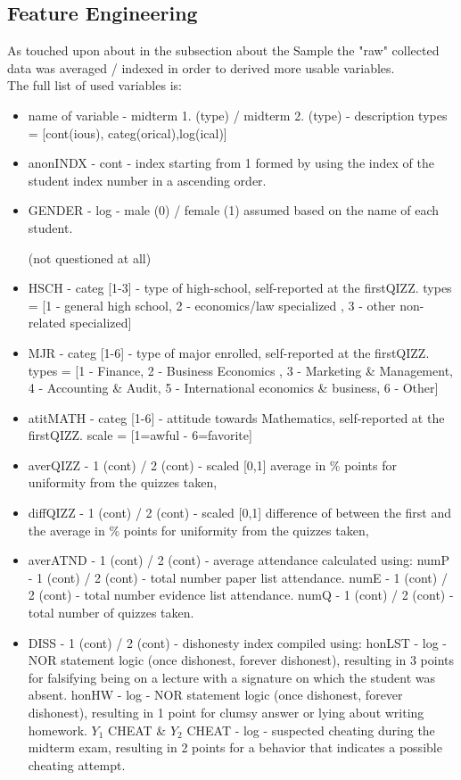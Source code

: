 \documentclass[]{article}
\begin{document}
	\subsection{Feature Engineering}
	As touched upon about in the subsection about the Sample the "raw" collected data was averaged / indexed in order to derived more usable variables.\\
	
	The full list of used variables is:
	
	\begin{itemize}
		\item [] name of variable - midterm 1. (type) / midterm 2. (type) - description
		\subitem types = [cont(ious), categ(orical),log(ical)]
		\item anonINDX - cont - index starting from 1 formed by using the index of the student index number in a ascending order.
		\item GENDER - log - male (0) / female (1) assumed based on the name of each student. \begin{small}(not questioned at all)\end{small}
		\item HSCH - categ [1-3] - type of high-school, self-reported at the firstQIZZ. 
		\subitem types = [1 - general high school, 2 - economics/law specialized , 3 - other non-related specialized]
		\item MJR - categ [1-6] - type of major enrolled, self-reported at the firstQIZZ.
		\subitem types = [1 - Finance, 2 - Business Economics , 3 - Marketing \& Management, 4 - Accounting \& Audit, 5 - International economics \& business, 6 - Other]
		\item atitMATH - categ [1-6] - attitude towards Mathematics, self-reported at the firstQIZZ.
		\subitem scale = [1=awful - 6=favorite]
		
		\item averQIZZ - 1 (cont) / 2 (cont) - scaled [0,1] average in \% points for uniformity from the quizzes taken,
		\item diffQIZZ - 1 (cont) / 2 (cont) - scaled [0,1] difference of between the first and the average in \% points for uniformity from the quizzes taken, 
		\item averATND - 1 (cont) / 2 (cont) - average attendance calculated using: 
		\subitem numP - 1 (cont) / 2 (cont) - total number paper list attendance.
		\subitem numE - 1 (cont) / 2 (cont) - total number evidence list attendance.
		\subitem numQ - 1 (cont) / 2 (cont) - total number of quizzes taken.
		\item DISS - 1 (cont) / 2 (cont) - dishonesty index compiled using:
		\subitem honLST - log - NOR statement logic (once dishonest, forever dishonest), resulting in 3 points for falsifying being on a lecture with a signature on which the student was absent.
		\subitem honHW - log - NOR statement logic (once dishonest, forever dishonest), resulting in 1 point for clumsy answer or lying about writing homework.
		\subitem $Y_1$ CHEAT \& $Y_2$ CHEAT - log - suspected cheating during the midterm exam, resulting in 2 points for a behavior that indicates a possible cheating attempt.\\
		

\end{itemize}
\end{document}
